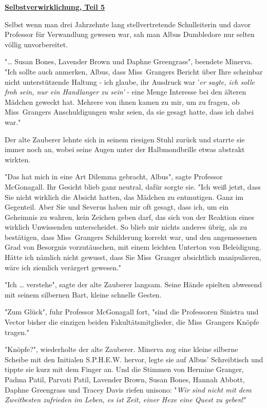 

\hypertarget{selbstverwirklichung-teil-5}{%

\textbf{\uline{Selbstverwirklichung, Teil 5}}

Selbst wenn man drei Jahrzehnte lang stellvertretende Schulleiterin und davor Professor für Verwandlung gewesen war, sah man Albus Dumbledore nur selten völlig unvorbereitet.

"… Susan Bones, Lavender Brown und Daphne Greengrass", beendete Minerva. "Ich sollte auch anmerken, Albus, dass Miss~Grangers Bericht über Ihre scheinbar nicht unterstützende Haltung - ich glaube, ihr Ausdruck war '\emph{er sagte, ich solle froh sein, nur ein Handlanger zu sein'} - eine Menge Interesse bei den älteren Mädchen geweckt hat. Mehrere von ihnen kamen zu mir, um zu fragen, ob Miss~Grangers Anschuldigungen wahr seien, da sie gesagt hatte, dass ich dabei war."

Der alte Zauberer lehnte sich in seinem riesigen Stuhl zurück und starrte sie immer noch an, wobei seine Augen unter der Halbmondbrille etwas abstrakt wirkten.

"Das hat mich in eine Art Dilemma gebracht, Albus", sagte Professor McGonagall. Ihr Gesicht blieb ganz neutral, dafür sorgte sie. "Ich weiß jetzt, dass Sie nicht wirklich die Absicht hatten, das Mädchen zu entmutigen. Ganz im Gegenteil. Aber Sie und Severus haben mir oft gesagt, dass ich, um ein Geheimnis zu wahren, kein Zeichen geben darf, das sich von der Reaktion eines wirklich Unwissenden unterscheidet. So blieb mir nichts anderes übrig, als zu bestätigen, dass Miss~Grangers Schilderung korrekt war, und den angemessenen Grad von Besorgnis vorzutäuschen, mit einem leichten Unterton von Beleidigung. Hätte ich nämlich nicht gewusst, dass Sie Miss~Granger absichtlich manipulieren, wäre ich ziemlich verärgert gewesen."

"Ich … verstehe", sagte der alte Zauberer langsam. Seine Hände spielten abwesend mit seinem silbernen Bart, kleine schnelle Gesten.

"Zum Glück", fuhr Professor McGonagall fort, "sind die Professoren Sinistra und Vector bisher die einzigen beiden Fakultätsmitglieder, die Miss~Grangers Knöpfe tragen."

"Knöpfe?", wiederholte der alte Zauberer. Minerva zog eine kleine silberne Scheibe mit den Initialen S.P.H.E.W. hervor, legte sie auf Albus' Schreibtisch und tippte sie kurz mit dem Finger an. Und die Stimmen von Hermine Granger, Padma Patil, Parvati Patil, Lavender Brown, Susan Bones, Hannah Abbott, Daphne Greengrass und Tracey Davis riefen unisono: "\emph{Wir sind nicht mit dem Zweitbesten zufrieden im Leben, es ist Zeit, einer Hexe eine Quest zu geben}!"

}
